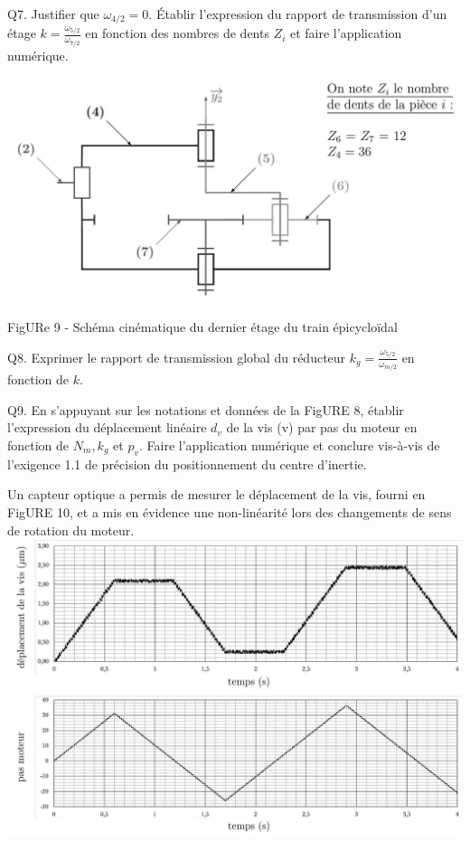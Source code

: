 \documentclass[10pt]{article}
\begin{document}
Q7. Justifier que $\omega_{4 / 2}=0$. Établir l'expression du rapport de transmission d'un étage $k=\frac{\omega_{5 / 2}}{\omega_{7 / 2}}$ en fonction des nombres de dents $Z_{i}$ et faire l'application numérique.

\begin{center}
\includegraphics[max width=\textwidth]{2024_04_26_3285cfc264024262add0g-08}
\end{center}

FigURe 9 - Schéma cinématique du dernier étage du train épicycloïdal

Q8. Exprimer le rapport de transmission global du réducteur $k_{g}=\frac{\omega_{5 / 2}}{\omega_{m / 2}}$ en fonction de $k$.

Q9. En s'appuyant sur les notations et données de la FigURE 8, établir l'expression du déplacement linéaire $d_{v}$ de la vis (v) par pas du moteur en fonction de $N_{m}, k_{g}$ et $p_{v}$. Faire l'application numérique et conclure vis-à-vis de l'exigence 1.1 de précision du positionnement du centre d'inertie.

Un capteur optique a permis de mesurer le déplacement de la vis, fourni en FigURE 10, et a mis en évidence une non-linéarité lors des changements de sens de rotation du moteur.\\
\includegraphics[max width=\textwidth, center]{2024_04_26_3285cfc264024262add0g-08(1)}
\end{document}
